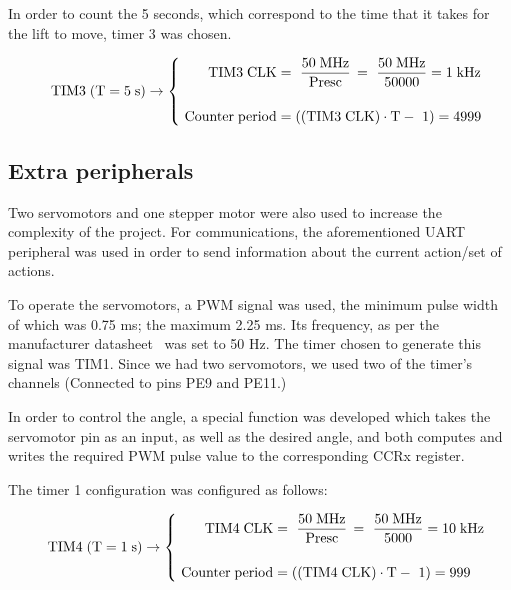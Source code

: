 In order to count the 5 seconds, which correspond to the time that it takes for the lift to move, timer 3 was chosen.  

\begin{equation*}
    \hspace{0.35cm} \mathrm{TIM3 \;} (\mathrm{T} = 5\;\mathrm{s)} \rightarrow \left\{ \begin{aligned}
	        \mathrm{TIM3 \; CLK} &= \,\, \dfrac{50\;\mathrm{MHz}}{\mathrm{Presc}} \, = \,\, \dfrac{50\;\mathrm{MHz}}{50000} = 1\;\mathrm{kHz}\\[\bigskipamount]
	        \,\, \mathrm{Counter \; period} &= \left( \left( \mathrm{TIM3 \; CLK} \right) \cdot \mathrm{T} -\,\,1 \right) = 4999\\
    \end{aligned} \right. \\[\bigskipamount]
\end{equation*}

\newpage

\subsection{Extra peripherals}

Two servomotors and one stepper motor were also used to increase the complexity of the project. For communications, the aforementioned UART peripheral was used in order to send information about the current action/set of actions. \medskip

To operate the servomotors, a PWM signal was used, the minimum pulse width of which was 0.75 ms; the maximum 2.25 ms. Its frequency, as per the manufacturer datasheet~\autocite{Parallax} was set to 50 Hz. The timer chosen to generate this signal was TIM1. Since we had two servomotors, we used two of the timer's channels (Connected to pins PE9 and PE11.)\medskip 

In order to control the angle, a special function was developed which takes the servomotor pin as an input, as well as the desired angle, and both computes and writes the required PWM pulse value to the corresponding CCRx register. 


The timer 1 configuration was configured as follows:

\begin{equation*}
    \hspace{0.35cm} \mathrm{TIM4 \;} (\mathrm{T} = 1\;\mathrm{s)} \rightarrow \left\{ \begin{aligned}
	   \mathrm{TIM4 \; CLK} &= \,\, \dfrac{50\;\mathrm{MHz}}{\mathrm{Presc}} \, = \,\, \dfrac{50\;\mathrm{MHz}}{5000} = 10\;\mathrm{kHz}\\[\bigskipamount]
	    \,\, \mathrm{Counter \; period} &= \left( \left( \mathrm{TIM4 \; CLK} \right) \cdot \mathrm{T} -\,\,1 \right) = 999\\
   \end{aligned} \right. \\[\bigskipamount]
\end{equation*}

